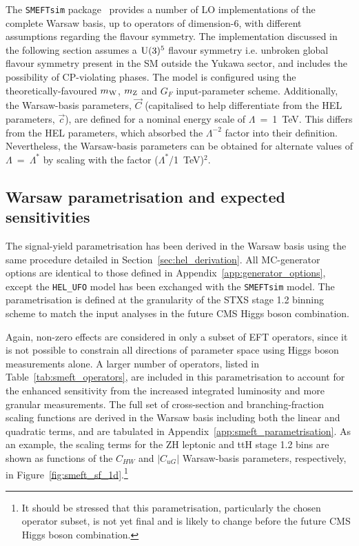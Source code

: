 The \texttt{SMEFTsim} package~\cite{Brivio:2017btx} provides a number of LO implementations of the complete Warsaw basis, up to operators of dimension-6, with different assumptions regarding the flavour symmetry. The implementation discussed in the following section assumes a ${\rm{U}}(3)^5$ flavour symmetry i.e. unbroken global flavour symmetry present in the SM outside the Yukawa sector, and includes the possibility of CP-violating phases. The model is configured using the theoretically-favoured $m_{\rm{W}}$, $m_{\rm{Z}}$ and $G_F$ input-parameter scheme. Additionally, the Warsaw-basis parameters, $\vec{C}$ (capitalised to help differentiate from the HEL parameters, $\vec{c}$), are defined for a nominal energy scale of $\Lambda$~=~1~TeV. This differs from the HEL parameters, which absorbed the $\Lambda^{-2}$ factor into their definition. Nevertheless, the Warsaw-basis parameters can be obtained for alternate values of $\Lambda$~=~$\Lambda^*$ by scaling with the factor ($\Lambda^*$/1~TeV)$^2$.

\subsection{Warsaw parametrisation and expected sensitivities}
The signal-yield parametrisation has been derived in the Warsaw basis using the same procedure detailed in Section~\ref{sec:hel_derivation}. All MC-generator options are identical to those defined in Appendix~\ref{app:generator_options}, except the \texttt{HEL\_UFO} model has been exchanged with the \texttt{SMEFTsim} model. The parametrisation is defined at the granularity of the STXS stage 1.2 binning scheme to match the input analyses in the future CMS Higgs boson combination. 

Again, non-zero effects are considered in only a subset of EFT operators, since it is not possible to constrain all directions of parameter space using Higgs boson measurements alone. A larger number of operators, listed in Table~\ref{tab:smeft_operators}, are included in this parametrisation to account for the enhanced sensitivity from the increased integrated luminosity and more granular measurements. The full set of cross-section and branching-fraction scaling functions are derived in the Warsaw basis including both the linear and quadratic terms, and are tabulated in Appendix~\ref{app:smeft_parametrisation}. As an example, the scaling terms for the ZH leptonic and ttH stage 1.2 bins are shown as functions of the $C_{HW}$ and $|C_{uG}|$ Warsaw-basis parameters, respectively, in Figure~\ref{fig:smeft_sf_1d}.\footnote{It should be stressed that this parametrisation, particularly the chosen operator subset, is not yet final and is likely to change before the future CMS Higgs boson combination.}

